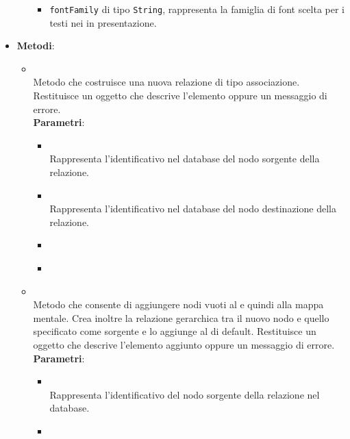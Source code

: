 \begin{itemize}
\begin{itemize}
\begin{itemize}
\item \texttt{fontFamily} di tipo \texttt{String}, rappresenta la famiglia di font scelta per i testi nei  in presentazione.
\end{itemize}
\end{itemize}
\item \textbf{Metodi}:
\begin{itemize}
\item {}
\\ Metodo  che costruisce una nuova relazione di tipo associazione. Restituisce un oggetto  che descrive l’elemento oppure un messaggio di errore.
\\ \textbf{Parametri}:
\begin{itemize}
\item {}
\\ Rappresenta l'identificativo nel database del nodo sorgente della relazione.
\item {}
\\ Rappresenta l’identificativo nel database del nodo destinazione della relazione.
\item {}
\\ \dpCallback
\item {}
\\ \dpErrBack
\end{itemize}
\item {}
\\ Metodo che consente di aggiungere nodi vuoti al  e quindi alla mappa mentale. Crea inoltre la relazione gerarchica tra il nuovo nodo e quello specificato come sorgente e lo aggiunge al  di default. Restituisce un oggetto  che descrive l'elemento aggiunto oppure un messaggio di errore.
\\ \textbf{Parametri}:
\begin{itemize}
\item {}
\\ Rappresenta l'identificativo del nodo sorgente della relazione nel database.
\item {}

\end{itemize}
\end{itemize}
\end{itemize}
